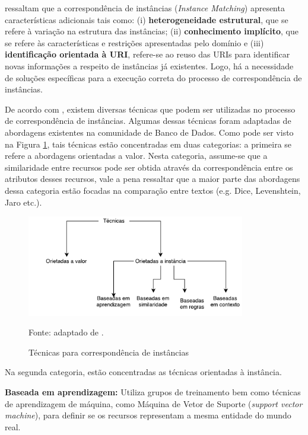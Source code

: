  ressaltam que a correspondência de instâncias (\textit{Instance Matching}) apresenta características adicionais tais como: (i) \textbf{heterogeneidade estrutural}, que se refere à variação na estrutura das instâncias; (ii)\textbf{ conhecimento implícito}, que se refere às características e restrições  apresentadas pelo domínio e (iii) \textbf{identificação orientada à URI}, refere-se ao reuso das URIs para identificar novas informações a respeito de instâncias já existentes. Logo, há a necessidade de soluções específicas para a execução correta do processo de correspondência de instâncias. 

De acordo com \cite{castano2011ontology}, existem diversas técnicas que podem ser utilizadas no processo de correspondência de instâncias. Algumas dessas técnicas foram adaptadas de abordagens existentes na comunidade de Banco de Dados. Como pode ser visto na Figura \ref{fig:im_techniques}, tais técnicas estão concentradas em duas categorias: a primeira se refere a abordagens orientadas a valor. Nesta categoria, assume-se que a similaridade entre recursos pode ser obtida através da correspondência entre os atributos desses recursos, vale a pena ressaltar que a maior parte das abordagens dessa categoria estão focadas na comparação entre textos (e.g. Dice, Levenshtein, Jaro etc.).

\begin{figure}[!h]
	\centering
	\includegraphics[width=0.85\textwidth]{./imagens/im_techniques.pdf}
	\caption{Técnicas para correspondência de instâncias}
	\footnotesize{Fonte: adaptado de \cite{castano2011ontology}.}
	\label{fig:im_techniques}
\end{figure}

Na segunda categoria, estão concentradas as técnicas orientadas à instância. 

\textbf{Baseada em aprendizagem:} Utiliza grupos de treinamento bem como técnicas de aprendizagem de máquina, como Máquina de Vetor de Suporte (\textit{support vector machine}), para definir se os recursos representam a mesma entidade do mundo real.

